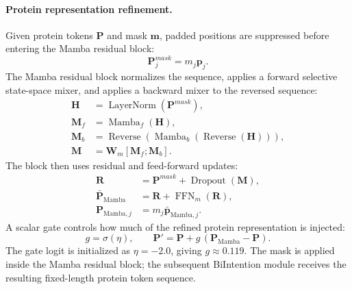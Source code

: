 \paragraph{Protein representation refinement.}
Given protein tokens $\mathbf{P}$ and mask $\mathbf{m}$, padded positions are
suppressed before entering the Mamba residual block:
\begin{equation}
  \mathbf{P}^{mask}_j = m_j\mathbf{p}_j.
  \label{eq:protein_masked_input}
\end{equation}
The Mamba residual block normalizes the sequence, applies a forward selective
state-space mixer, and applies a backward mixer to the reversed sequence:
\begin{equation}
\begin{aligned}
  \mathbf{H} &= \operatorname{LayerNorm}(\mathbf{P}^{mask}),\\
  \mathbf{M}_{f} &= \operatorname{Mamba}_{f}(\mathbf{H}),\\
  \mathbf{M}_{b} &=
  \operatorname{Reverse}\!\left(
    \operatorname{Mamba}_{b}(\operatorname{Reverse}(\mathbf{H}))
  \right),\\
  \mathbf{M} &= \mathbf{W}_{m}[\mathbf{M}_{f};\mathbf{M}_{b}].
\end{aligned}
\label{eq:bidirectional_mamba}
\end{equation}
The block then uses residual and feed-forward updates:
\begin{equation}
\begin{aligned}
  \mathbf{R} &=
  \mathbf{P}^{mask}+\operatorname{Dropout}(\mathbf{M}),\\
  \bar{\mathbf{P}}_{\mathrm{Mamba}} &=
  \mathbf{R}+\operatorname{FFN}_{m}(\mathbf{R}),\\
  \mathbf{P}_{\mathrm{Mamba},j} &=
  m_j\bar{\mathbf{p}}_{\mathrm{Mamba},j}.
\end{aligned}
\label{eq:mamba_residual}
\end{equation}
A scalar gate controls how much of the refined protein representation is
injected:
\begin{equation}
  g = \sigma(\eta),\qquad
  \mathbf{P}'
  =
  \mathbf{P}+g\,(\mathbf{P}_{\mathrm{Mamba}}-\mathbf{P}).
  \label{eq:mamba_gate}
\end{equation}
The gate logit is initialized as $\eta=-2.0$, giving $g\approx0.119$. The
mask is applied inside the Mamba residual block; the subsequent BiIntention
module receives the resulting fixed-length protein token sequence.

